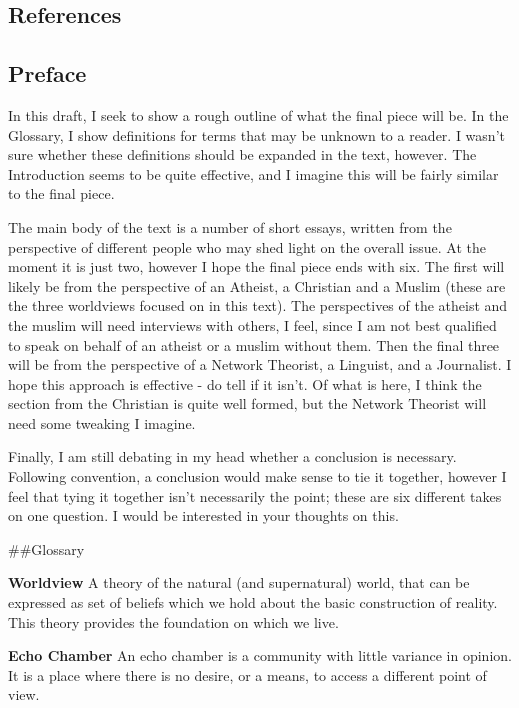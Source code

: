 \documentclass[]{article}
\date{}
\begin{document}
\tableofcontents
\subsection{References}
\nocite{*} 
\printbibliography[heading=none]
\hypertarget{preface}{%
\subsection{Preface}\label{preface}}

In this draft, I seek to show a rough outline of what the final piece
will be. In the Glossary, I show definitions for terms that may be
unknown to a reader. I wasn't sure whether these definitions should be
expanded in the text, however. The Introduction seems to be quite
effective, and I imagine this will be fairly similar to the final piece.

The main body of the text is a number of short essays, written from the
perspective of different people who may shed light on the overall issue.
At the moment it is just two, however I hope the final piece ends with
six. The first will likely be from the perspective of an Atheist, a
Christian and a Muslim (these are the three worldviews focused on in
this text). The perspectives of the atheist and the muslim will need
interviews with others, I feel, since I am not best qualified to speak
on behalf of an atheist or a muslim without them. Then the final three
will be from the perspective of a Network Theorist, a Linguist, and a
Journalist. I hope this approach is effective - do tell if it isn't. Of
what is here, I think the section from the Christian is quite well
formed, but the Network Theorist will need some tweaking I imagine.

Finally, I am still debating in my head whether a conclusion is
necessary. Following convention, a conclusion would make sense to tie it
together, however I feel that tying it together isn't necessarily the
point; these are six different takes on one question. I would be
interested in your thoughts on this.

\#\#Glossary

\textbf{Worldview} A theory of the natural (and supernatural) world,
that can be expressed as set of beliefs which we hold about the basic
construction of reality. This theory provides the foundation on which we
live.

\textbf{Echo Chamber} An echo chamber is a community with little
variance in opinion. It is a place where there is no desire, or a means,
to access a different point of view.\autocite{Thwaitenewtheoryecho2018}
\end{document}
